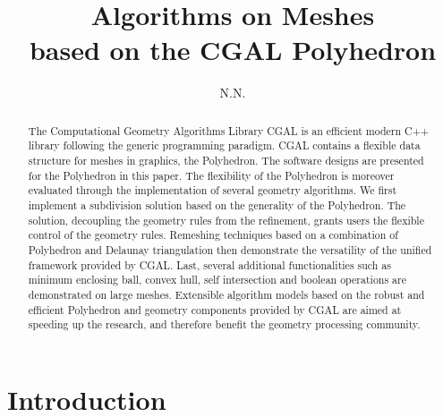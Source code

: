 \documentclass{egpubl}
\title{Algorithms on Meshes \\ 
       based on the CGAL Polyhedron}
\author[N.N.]{N.N.}
\begin{document}
\maketitle

\begin{abstract}



The Computational Geometry Algorithms Library CGAL is an efficient
modern C++ library following the generic programming paradigm. CGAL
contains a flexible data structure for meshes in graphics, the
Polyhedron. The software designs are presented for the Polyhedron in
this paper. The flexibility of the Polyhedron is moreover evaluated
through the implementation of several geometry algorithms.  We first
implement a subdivision solution based on the generality of the
Polyhedron. The solution, decoupling the geometry rules from the
refinement, grants users the flexible control of the geometry rules.
Remeshing techniques based on a combination of Polyhedron and Delaunay
triangulation then demonstrate the versatility of the unified
framework provided by CGAL.  Last, several additional functionalities
such as minimum enclosing ball, convex hull, self intersection and
boolean operations are demonstrated on large meshes.  Extensible
algorithm models based on the robust and efficient Polyhedron and
geometry components provided by CGAL are aimed at speeding up the
research, and therefore benefit the geometry processing community.

\begin{classification} %
\end{classification}

\end{abstract}


\section{Introduction}

\end{document}
